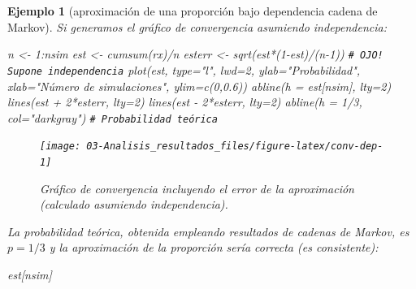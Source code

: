 \documentclass[
]{book}
\newenvironment{Shaded}{\begin{snugshade}}{\end{snugshade}}
\newcommand{\AttributeTok}[1]{\textcolor[rgb]{0.77,0.63,0.00}{#1}}
\newcommand{\CommentTok}[1]{\textcolor[rgb]{0.56,0.35,0.01}{\textit{#1}}}
\newcommand{\DecValTok}[1]{\textcolor[rgb]{0.00,0.00,0.81}{#1}}
\newcommand{\FloatTok}[1]{\textcolor[rgb]{0.00,0.00,0.81}{#1}}
\newcommand{\FunctionTok}[1]{\textcolor[rgb]{0.00,0.00,0.00}{#1}}
\newcommand{\NormalTok}[1]{#1}
\newcommand{\OtherTok}[1]{\textcolor[rgb]{0.56,0.35,0.01}{#1}}
\newcommand{\SpecialCharTok}[1]{\textcolor[rgb]{0.00,0.00,0.00}{#1}}
\newcommand{\StringTok}[1]{\textcolor[rgb]{0.31,0.60,0.02}{#1}}
\theoremstyle{break}
\newtheorem{example}{Ejemplo}[chapter]
\theoremstyle{nonumberplain}
\renewcommand{\CommentTok}[1]{\textcolor[rgb]{0.41,0.41,0.41}{\texttt{#1}}}
\begin{document}
\begin{example}[aproximación de una proporción bajo dependencia cadena de Markov]
Si generamos el gráfico de convergencia asumiendo independencia:

\begin{Shaded}
\begin{Highlighting}[]
\NormalTok{n }\OtherTok{\textless{}{-}} \DecValTok{1}\SpecialCharTok{:}\NormalTok{nsim}
\NormalTok{est }\OtherTok{\textless{}{-}} \FunctionTok{cumsum}\NormalTok{(rx)}\SpecialCharTok{/}\NormalTok{n}
\NormalTok{esterr }\OtherTok{\textless{}{-}} \FunctionTok{sqrt}\NormalTok{(est}\SpecialCharTok{*}\NormalTok{(}\DecValTok{1}\SpecialCharTok{{-}}\NormalTok{est)}\SpecialCharTok{/}\NormalTok{(n}\DecValTok{{-}1}\NormalTok{)) }\CommentTok{\# OJO! Supone independencia}
\FunctionTok{plot}\NormalTok{(est, }\AttributeTok{type=}\StringTok{"l"}\NormalTok{, }\AttributeTok{lwd=}\DecValTok{2}\NormalTok{, }\AttributeTok{ylab=}\StringTok{"Probabilidad"}\NormalTok{, }
     \AttributeTok{xlab=}\StringTok{"Número de simulaciones"}\NormalTok{, }\AttributeTok{ylim=}\FunctionTok{c}\NormalTok{(}\DecValTok{0}\NormalTok{,}\FloatTok{0.6}\NormalTok{))}
\FunctionTok{abline}\NormalTok{(}\AttributeTok{h =}\NormalTok{ est[nsim], }\AttributeTok{lty=}\DecValTok{2}\NormalTok{)}
\FunctionTok{lines}\NormalTok{(est }\SpecialCharTok{+} \DecValTok{2}\SpecialCharTok{*}\NormalTok{esterr, }\AttributeTok{lty=}\DecValTok{2}\NormalTok{) }
\FunctionTok{lines}\NormalTok{(est }\SpecialCharTok{{-}} \DecValTok{2}\SpecialCharTok{*}\NormalTok{esterr, }\AttributeTok{lty=}\DecValTok{2}\NormalTok{)}
\FunctionTok{abline}\NormalTok{(}\AttributeTok{h =} \DecValTok{1}\SpecialCharTok{/}\DecValTok{3}\NormalTok{, }\AttributeTok{col=}\StringTok{"darkgray"}\NormalTok{) }\CommentTok{\# Probabilidad teórica}
\end{Highlighting}
\end{Shaded}

\begin{figure}[!htb]

{\centering \texttt{[image: 03-Analisis\_resultados\_files/figure-latex/conv-dep-1]} 

}

\caption{Gráfico de convergencia incluyendo el error de la aproximación (calculado asumiendo independencia).}\label{fig:conv-dep}
\end{figure}

La probabilidad teórica, obtenida empleando resultados de cadenas de Markov, es \(p = 1/3\) y la aproximación de la proporción sería correcta (es consistente):

\begin{Shaded}
\begin{Highlighting}[]
\NormalTok{est[nsim]}
\end{Highlighting}
\end{Shaded}


\end{example}
\end{document}
